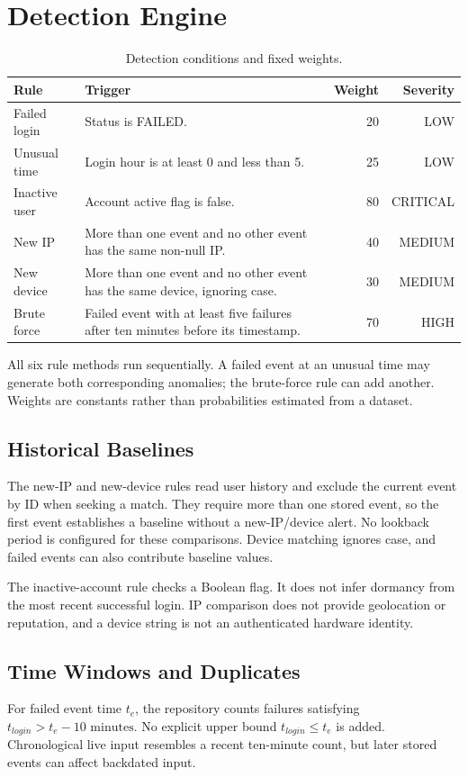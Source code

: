 \section{Detection Engine}
\begin{table}[htbp]\centering\small\caption{Detection conditions and fixed weights.}\label{tab:rules}
\begin{tabularx}{\textwidth}{lYrr}\toprule Rule & Trigger & Weight & Severity\\\midrule
Failed login & Status is FAILED. & 20 & LOW\\
Unusual time & Login hour is at least 0 and less than 5. & 25 & LOW\\
Inactive user & Account active flag is false. & 80 & CRITICAL\\
New IP & More than one event and no other event has the same non-null IP. & 40 & MEDIUM\\
New device & More than one event and no other event has the same device, ignoring case. & 30 & MEDIUM\\
Brute force & Failed event with at least five failures after ten minutes before its timestamp. & 70 & HIGH\\\bottomrule\end{tabularx}\end{table}

All six rule methods run sequentially. A failed event at an unusual time may generate both corresponding anomalies; the brute-force rule can add another. Weights are constants rather than probabilities estimated from a dataset.

\subsection{Historical Baselines}
The new-IP and new-device rules read user history and exclude the current event by ID when seeking a match. They require more than one stored event, so the first event establishes a baseline without a new-IP/device alert. No lookback period is configured for these comparisons. Device matching ignores case, and failed events can also contribute baseline values.

The inactive-account rule checks a Boolean flag. It does not infer dormancy from the most recent successful login. IP comparison does not provide geolocation or reputation, and a device string is not an authenticated hardware identity.

\subsection{Time Windows and Duplicates}
For failed event time $t_e$, the repository counts failures satisfying $t_{login}>t_e-10\text{ minutes}$. No explicit upper bound $t_{login}\leq t_e$ is added. Chronological live input resembles a recent ten-minute count, but later stored events can affect backdated input.


